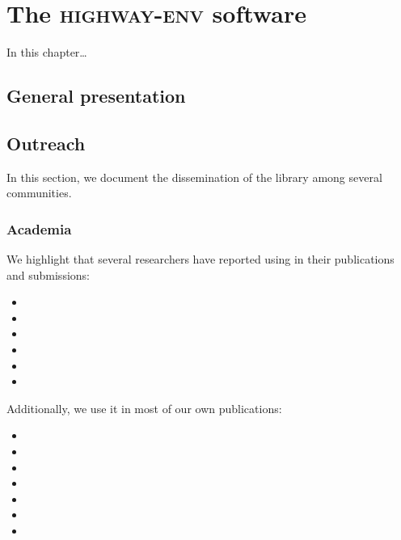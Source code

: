 
\chapter{The \textsc{highway-env} software}

\label{chapter:a}

\abstractStartChapter{}%
In this chapter\dots
\minitocStartChapter{}

\section{General presentation}


\section{Outreach}
\label{sec:outreach}
In this section, we document the dissemination of the library among several communities.

\subsection{Academia}

We highlight that several researchers have reported using \highwayenv in their publications and submissions:
\begin{itemize}
	\item {}
	\item {}
	\item {}
	\item {}
	\item {}
	\item {}
\end{itemize}

\leavevmode\newline
Additionally, we use it in most of our own publications:
\begin{itemize}
	\item {}
	\item {}
	\item {}
	\item {}
	\item {}
	\item {}
	\item {}
\end{itemize}

